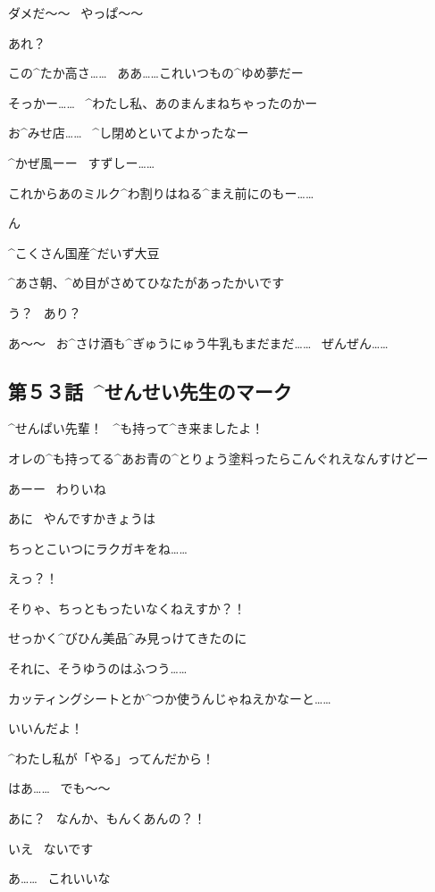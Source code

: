 \Alpha ダメだ〜〜
\ やっぱ〜〜

\page
\Alpha あれ？

\page
\Alpha この^{たか}{高}さ……
\ ああ……これいつもの^{ゆめ}{夢}だー

\Alpha そっかー……
\ ^{わたし}{私}、あのまんまねちゃったのかー

\Alpha お^{みせ}{店}……
\ ^{し}{閉}めといてよかったなー

\Alpha ^{かぜ}{風}ーー
\ すずしー……

\Alpha これからあのミルク^{わ}{割}りはねる^{まえ}{前}にのもー……

\page
\Alpha ん

\Sign ^{こくさん}{国産}^{だいず}{大豆}

\Alpha ^{あさ}{朝}、^{め}{目}がさめてひなたがあったかいです

\Alpha う？
\ あり？

\Alpha あ〜〜
\ お^{さけ}{酒}も^{ぎゅうにゅう}{牛乳}もまだまだ……
\ ぜんぜん……


\subsection{第５３話\ ^{せんせい}{先生}のマーク}

\page[140]
\Ojisan ^{せんぱい}{先輩}！
\ ^{も}{持}って^{き}{来}ましたよ！

\Ojisan オレの^{も}{持}ってる^{あお}{青}の^{とりょう}{塗料}ったらこんぐれえなんすけどー

\page
\Sensei あーー
\ わりいね

\Ojisan あに
\ やんですかきょうは

\Sensei ちっとこいつにラクガキをね……

\Ojisan えっ？！

\Ojisan そりゃ、ちっともったいなくねえすか？！

\Ojisan せっかく^{びひん}{美品}^{み}{見}っけてきたのに

\page
\Ojisan それに、そうゆうのはふつう……

\Ojisan カッティングシートとか^{つか}{使}うんじゃねえかなーと……

\Sensei いいんだよ！

\Sensei ^{わたし}{私}が「やる」ってんだから！

\Ojisan はあ……
\ でも〜〜

\Sensei あに？
\ なんか、もんくあんの？！

\Ojisan いえ
\ ないです

\page
\Sensei あ……
\ これいいな

